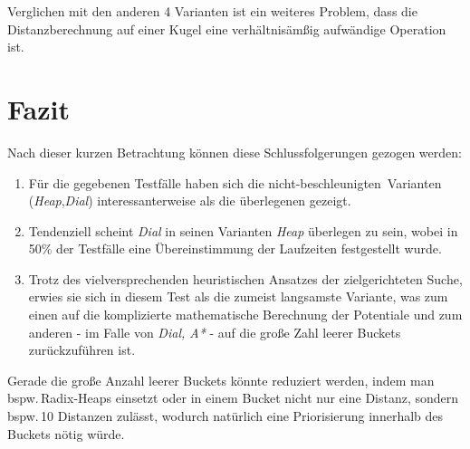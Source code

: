 \documentclass{scrartcl}
\begin{document}
Verglichen mit den anderen 4 Varianten ist ein weiteres Problem, dass die 
Distanzberechnung auf einer Kugel eine verhältnisämßig aufwändige Operation 
ist.

\section{Fazit}

Nach dieser kurzen Betrachtung können diese Schlussfolgerungen gezogen werden:
\begin{enumerate}
  \item Für die gegebenen Testfälle haben sich die 
        \glqq nicht-beschleunigten\grqq\ Varianten 
        (\emph{Heap},\emph{Dial}) interessanterweise als die überlegenen
        gezeigt.
  \item Tendenziell scheint \emph{Dial} in seinen Varianten \emph{Heap}
        überlegen zu sein, wobei in 50\% der Testfälle eine Übereinstimmung der
        Laufzeiten festgestellt wurde.
  \item Trotz des vielversprechenden heuristischen Ansatzes der zielgerichteten
        Suche, erwies sie sich in diesem Test als die zumeist langsamste 
        Variante, was zum einen auf die komplizierte mathematische Berechnung
        der Potentiale und zum anderen - im Falle von \emph{Dial, A*} - 
        auf die große Zahl leerer Buckets zurückzuführen ist.
\end{enumerate}

Gerade die große Anzahl leerer Buckets könnte reduziert werden, indem man
bspw.\,Radix-Heaps einsetzt oder in einem Bucket nicht nur eine Distanz,
sondern bspw.\,10 Distanzen zulässt, wodurch natürlich eine Priorisierung 
innerhalb des Buckets nötig würde.
\end{document}
